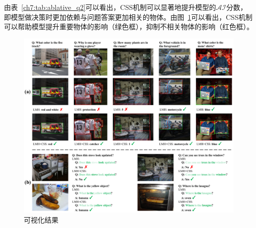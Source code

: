 \begin{table}[tbp]
    \begin{center}
    \end{center}
    \caption{左：VQA-CP-Rephrasing数据集中的$CS(k)$；右：VQA-CP v2测试集中$\mathcal{CI}$分数}
    \label{ch7:tab:ablative_q3}
\end{table}

由表~\ref{ch7:tab:ablative_q2}可以看出，CSS机制可以显著地提升模型的$\mathcal{AI}$分数，即模型做决策时更加依赖与问题答案更加相关的物体。由图~\ref{ch7:fig:visualization}可以看出，CSS机制可以帮助模型提升重要物体的影响（绿色框），抑制不相关物体的影响（红色框）。

\begin{figure}[t]
    \centering
        \includegraphics[width=\linewidth]{chapter7/res/visualization.pdf}
    \caption{可视化结果}
    \label{ch7:fig:visualization}
\end{figure}


